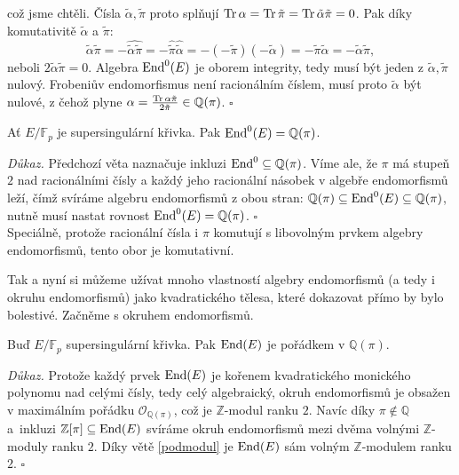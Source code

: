 \documentclass[12pt]{report}
\begin{document}
což jsme chtěli. Čísla $\tilde{\alpha}, \tilde{\pi}$ proto splňují $\operatorname{Tr} \alpha = \operatorname{Tr} \tilde{\pi} = \operatorname{Tr} \tilde{\alpha} \tilde{\pi} = 0$. Pak díky komutativitě $\tilde{\alpha}$ a $\tilde{\pi}$:
\begin{equation*}
\tilde{\alpha} \tilde{\pi} = -\widehat{\tilde{\alpha} \tilde{\pi}} = - \widehat{\tilde{\pi}} \widehat{\tilde{\alpha}} = - (- \tilde{\pi}) (-\tilde{\alpha}) = - \tilde{\pi} \tilde{\alpha}= - \tilde{\alpha} \tilde{\pi}, 
\end{equation*}
neboli $2 \tilde{\alpha} \tilde{\pi} = 0$. Algebra $\operatorname{End}^0 (E)$ je oborem integrity, tedy musí být jeden z $\tilde{\alpha},\tilde{\pi}$ nulový. Frobeniův endomorfismus není racionálním číslem, musí proto $\tilde{\alpha}$ být nulové, z čehož plyne $\alpha = \frac{\operatorname{Tr} \alpha \tilde{\pi}}{2 \tilde{\pi}} \in \mathbb{Q}(\pi)$. \hfill $\square$\\

\begin{dusledek}
Ať $E/\mathbb{F}_p$ je supersingulární křivka. Pak $\operatorname{End}^0 (E) = \mathbb{Q}(\pi)$.
\end{dusledek}
\noindent \textit{Důkaz.} Předchozí věta naznačuje inkluzi $\operatorname{End}^0 \subseteq \mathbb{Q}(\pi)$. Víme ale, že $\pi$ má stupeň $2$ nad racionálními čísly a každý jeho racionální násobek v algebře endomorfismů leží, čímž svíráme algebru endomorfismů z obou stran: $\mathbb{Q}(\pi) \subseteq \operatorname{End} ^0 (E) \subseteq \mathbb{Q}(\pi)$, nutně musí nastat rovnost $\operatorname{End}^0 (E) = \mathbb{Q}(\pi)$. \hfill $\square$\\

Speciálně, protože racionální čísla i $\pi$ komutují s libovolným prvkem algebry endomorfismů, tento obor je komutativní. 

Tak a nyní si můžeme užívat mnoho vlastností algebry endomorfismů (a tedy i okruhu endomorfismů) jako kvadratického tělesa, které dokazovat přímo by bylo bolestivé. Začněme s okruhem endomorfismů.

\begin{veta}
Buď $E/\mathbb{F}_p$ supersingulární křivka. Pak $\operatorname{End}(E)$ je pořádkem v $\mathbb{Q}(\pi)$. 
\end{veta}
\noindent \textit{Důkaz.} Protože každý prvek $\operatorname{End}(E)$ je kořenem kvadratického monického polynomu nad celými čísly, tedy celý algebraický, okruh endomorfismů je obsažen v maximálním pořádku $\mathcal{O}_{\mathbb{Q}(\pi)}$, což je $\mathbb{Z}$-modul ranku $2$. Navíc díky $\pi \not\in \mathbb{Q}$ a~inkluzi $\mathbb{Z}[\pi] \subseteq \operatorname{End}(E)$ svíráme okruh endomorfismů mezi dvěma volnými $\mathbb{Z}$-moduly ranku $2$. Díky větě \ref{podmodul} je $\operatorname{End}(E)$ sám volným $\mathbb{Z}$-modulem ranku $2$. \hfill $\square$\\
\end{document}
